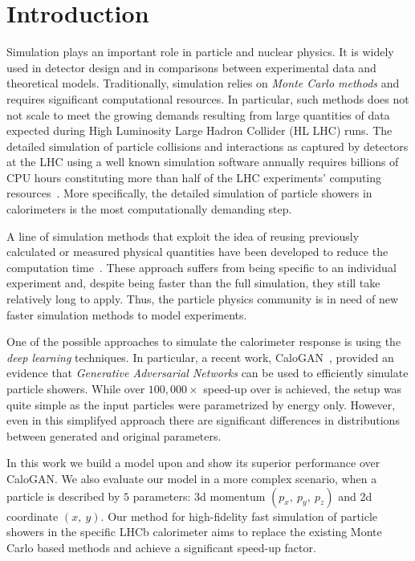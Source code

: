 \section{Introduction}

Simulation plays an important role in particle and nuclear physics. It is widely used in detector design and in comparisons between experimental data and theoretical models. Traditionally, simulation relies on \textit{Monte Carlo methods} and requires significant computational resources. In particular, such methods does not not scale to meet the growing demands resulting from large quantities of data expected during High Luminosity Large Hadron Collider (HL LHC) runs. The detailed simulation of particle collisions and interactions as captured by detectors at the LHC using a well known simulation software \geant annually requires billions of CPU hours constituting more than half of the LHC experiments' computing resources~\cite{bozzi2014,flynn2015computing}. More specifically, the detailed simulation of particle showers in calorimeters is the most computationally demanding step.
 
A line of simulation methods that exploit the idea of reusing previously calculated or measured physical quantities have been developed to reduce the computation time~\cite{grindhammer2000parameterized,atlas2010simulation}. These approach suffers from being specific to an individual experiment and, despite being faster than the full simulation, they still take relatively long to apply. Thus, the particle physics community is in need of new faster simulation methods to model experiments. 
    
One of the possible approaches to simulate the calorimeter response is using the \textit{deep learning} techniques. In particular, a recent work, CaloGAN~\cite{paganini2017calogan}, provided an evidence that \textit{Generative Adversarial Networks} can be used to efficiently simulate particle showers. While over $100,000 \times$ speed-up over \geant is achieved, the setup was quite simple as the input particles were parametrized by energy only. However,  even in this simplifyed approach there are significant differences in distributions between generated and original parameters. 

In this work we build a model upon  and show its superior performance over CaloGAN. We also evaluate our model in a more complex scenario, when a particle is described by $5$ parameters: 3d momentum $(p_x,~ p_y,~ p_z)$ and 2d coordinate $(x,~ y)$. Our method for high-fidelity fast simulation of particle showers in the specific LHCb calorimeter aims to replace the existing Monte Carlo based methods and achieve a significant speed-up factor.
 



